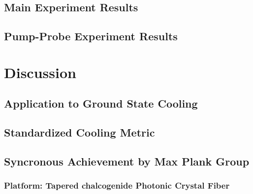   \subsection{Main Experiment Results}

  \subsection{Pump-Probe Experiment Results}

\section{Discussion}

  \subsection{Application to Ground State Cooling}

  \subsection{Standardized Cooling Metric}

  \subsection{Syncronous Achievement by Max Plank Group}

    \subsubsection{Platform: Tapered chalcogenide Photonic Crystal Fiber}
